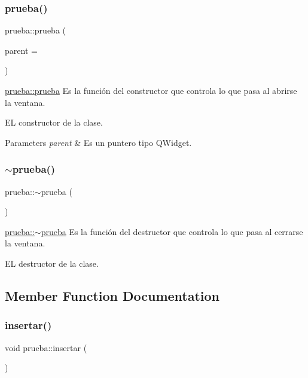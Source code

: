 \subsubsection{\texorpdfstring{prueba()}{prueba()}}
{\footnotesize\ttfamily prueba\+::prueba (\begin{DoxyParamCaption}\item[{Q\+Widget $\ast$}]{parent = {} }\end{DoxyParamCaption})\hspace{0.3cm}{\ttfamily [explicit]}}



\hyperlink{classprueba_a24f54c7bdd250ae7c191204b6640e76a}{prueba\+::prueba} Es la función del constructor que controla lo que pasa al abrirse la ventana. 

EL constructor de la clase.


\begin{DoxyParams}{Parameters}
{\em parent} & Es un puntero tipo Q\+Widget. \\
\hline
\end{DoxyParams}
\mbox{\label{classprueba_a10ec83347646102027f40a34f8cc9688}} 
\subsubsection{\texorpdfstring{$\sim$prueba()}{~prueba()}}
{\footnotesize\ttfamily prueba\+::$\sim$prueba (\begin{DoxyParamCaption}{ }\end{DoxyParamCaption})}



\hyperlink{classprueba_a10ec83347646102027f40a34f8cc9688}{prueba\+::$\sim$prueba} Es la función del destructor que controla lo que pasa al cerrarse la ventana. 

EL destructor de la clase. 

\subsection{Member Function Documentation}
\mbox{\label{classprueba_ac7bf490420a1bd8080157ce2e2d6b78c}} 
\subsubsection{\texorpdfstring{insertar()}{insertar()}}
{\footnotesize\ttfamily void prueba\+::insertar (\begin{DoxyParamCaption}{ }\end{DoxyParamCaption})}



